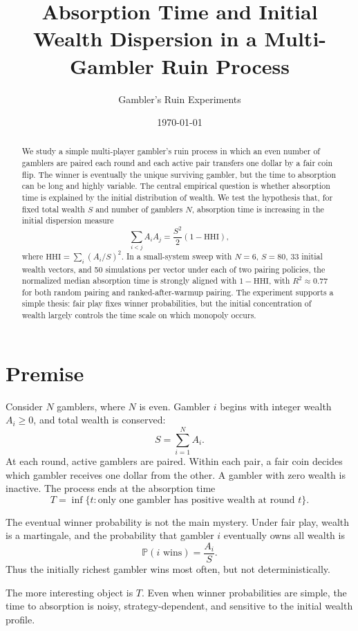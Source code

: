 \documentclass[10pt]{article}
\title{\textbf{Absorption Time and Initial Wealth Dispersion in a Multi-Gambler Ruin Process}}
\author{Gambler's Ruin Experiments}
\date{\today}
\begin{document}
\maketitle

\begin{abstract}
We study a simple multi-player gambler's ruin process in which an even number of gamblers are paired each round and each active pair transfers one dollar by a fair coin flip. The winner is eventually the unique surviving gambler, but the time to absorption can be long and highly variable. The central empirical question is whether absorption time is explained by the initial distribution of wealth. We test the hypothesis that, for fixed total wealth $S$ and number of gamblers $N$, absorption time is increasing in the initial dispersion measure
\[
  \sum_{i<j} A_i A_j
  =
  \frac{S^2}{2}\left(1-\mathrm{HHI}\right),
\]
where $\mathrm{HHI}=\sum_i (A_i/S)^2$. In a small-system sweep with $N=6$, $S=80$, 33 initial wealth vectors, and 50 simulations per vector under each of two pairing policies, the normalized median absorption time is strongly aligned with $1-\mathrm{HHI}$, with $R^2 \approx 0.77$ for both random pairing and ranked-after-warmup pairing. The experiment supports a simple thesis: fair play fixes winner probabilities, but the initial concentration of wealth largely controls the time scale on which monopoly occurs.
\end{abstract}

\section{Premise}

Consider $N$ gamblers, where $N$ is even. Gambler $i$ begins with integer wealth $A_i\geq 0$, and total wealth is conserved:
\[
  S = \sum_{i=1}^N A_i.
\]
At each round, active gamblers are paired. Within each pair, a fair coin decides which gambler receives one dollar from the other. A gambler with zero wealth is inactive. The process ends at the absorption time
\[
  T = \inf\{t: \text{only one gambler has positive wealth at round } t\}.
\]

The eventual winner probability is not the main mystery. Under fair play, wealth is a martingale, and the probability that gambler $i$ eventually owns all wealth is
\[
  \mathbb{P}(i \text{ wins}) = \frac{A_i}{S}.
\]
Thus the initially richest gambler wins most often, but not deterministically.

The more interesting object is $T$. Even when winner probabilities are simple, the time to absorption is noisy, strategy-dependent, and sensitive to the initial wealth profile.
\end{document}
